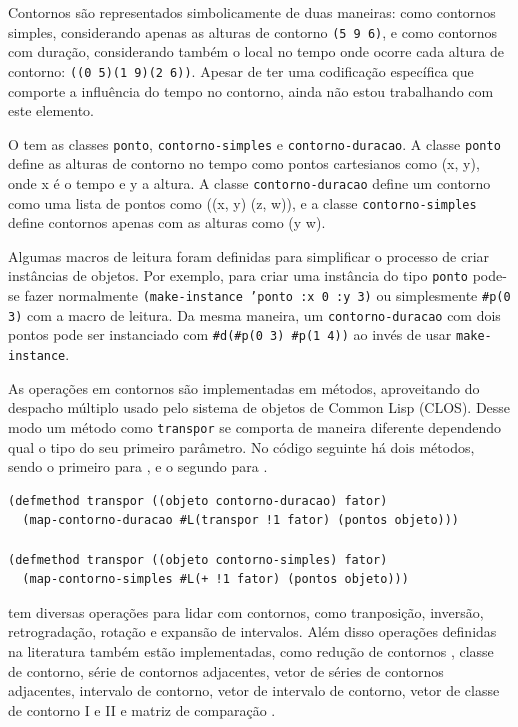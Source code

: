 Contornos são representados simbolicamente de duas maneiras: como
contornos simples, considerando apenas as alturas de contorno
\verb!(5 9 6)!, e como contornos com duração, considerando também o
local no tempo onde ocorre cada altura de contorno:
\verb!((0 5)(1 9)(2 6))!. Apesar de ter uma codificação específica que
comporte a influência do tempo no contorno, ainda não estou
trabalhando com este elemento.

O \goiaba{} tem as classes \texttt{ponto}, \texttt{contorno-simples} e
\texttt{contorno-duracao}. A classe \texttt{ponto} define as alturas
de contorno no tempo como pontos cartesianos como (x, y), onde x é o
tempo e y a altura. A classe \texttt{contorno-duracao} define um
contorno como uma lista de pontos como ((x, y) (z, w)), e a classe
\texttt{contorno-simples} define contornos apenas com as alturas como
(y w).

Algumas macros de leitura foram definidas para simplificar o processo
de criar instâncias de objetos. Por exemplo, para criar uma instância
do tipo \texttt{ponto} pode-se fazer normalmente
\texttt{(make-instance 'ponto :x 0 :y 3)} ou simplesmente
\verb!#p(0 3)! com a macro de leitura. Da mesma maneira, um
\texttt{contorno-duracao} com dois pontos pode ser instanciado com
\verb!#d(#p(0 3) #p(1 4))! ao invés de usar \texttt{make-instance}.

As operações em contornos são implementadas em métodos, aproveitando
do despacho múltiplo usado pelo sistema de objetos de Common Lisp
(CLOS). Desse modo um método como \texttt{transpor} se comporta de
maneira diferente dependendo qual o tipo do seu primeiro parâmetro. No
código seguinte há dois métodos, sendo o primeiro para
, e o segundo para .

\singlespacing
\begin{verbatim}
(defmethod transpor ((objeto contorno-duracao) fator)
  (map-contorno-duracao #L(transpor !1 fator) (pontos objeto)))

(defmethod transpor ((objeto contorno-simples) fator)
  (map-contorno-simples #L(+ !1 fator) (pontos objeto)))
\end{verbatim}
\doublespacing

\goiaba{} tem diversas operações para lidar com contornos, como
tranposição, inversão, retrogradação, rotação e expansão de
intervalos. Além disso operações definidas na literatura também estão
implementadas, como redução de contornos \cite{adams76:melodic},
classe de contorno, série de contornos adjacentes, vetor de séries de
contornos adjacentes, intervalo de contorno, vetor de intervalo de
contorno, vetor de classe de contorno I e II
\cite{friedmann85:methodology} e matriz de comparação
\cite{morris93:directions}.

